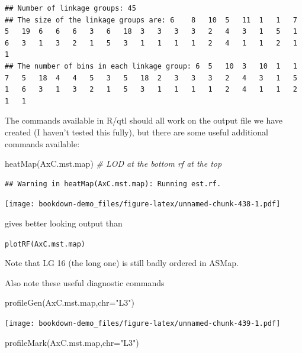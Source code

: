 \documentclass[
]{book}
\newenvironment{Shaded}{\begin{snugshade}}{\end{snugshade}}
\newcommand{\AttributeTok}[1]{\textcolor[rgb]{0.77,0.63,0.00}{#1}}
\newcommand{\CommentTok}[1]{\textcolor[rgb]{0.56,0.35,0.01}{\textit{#1}}}
\newcommand{\FunctionTok}[1]{\textcolor[rgb]{0.00,0.00,0.00}{#1}}
\newcommand{\NormalTok}[1]{#1}
\newcommand{\StringTok}[1]{\textcolor[rgb]{0.31,0.60,0.02}{#1}}
\begin{document}
\begin{verbatim}
## Number of linkage groups: 45
## The size of the linkage groups are: 6    8   10  5   11  1   1   7   5   19  6   6   6   3   6   18  3   3   3   3   2   4   3   1   5   1   6   3   1   3   2   1   5   3   1   1   1   1   2   4   1   1   2   1   1   
## The number of bins in each linkage group: 6  5   10  3   10  1   1   7   5   18  4   4   5   3   5   18  2   3   3   3   2   4   3   1   5   1   6   3   1   3   2   1   5   3   1   1   1   1   2   4   1   1   2   1   1   
\end{verbatim}

The commands available in R/qtl should all work on the output file we have created (I haven't tested this fully), but there are some useful additional commands available:

\begin{Shaded}
\begin{Highlighting}[]
\FunctionTok{heatMap}\NormalTok{(AxC.mst.map) }\CommentTok{\# LOD at the bottom rf at the top }
\end{Highlighting}
\end{Shaded}

\begin{verbatim}
## Warning in heatMap(AxC.mst.map): Running est.rf.
\end{verbatim}

\texttt{[image: bookdown-demo\_files/figure-latex/unnamed-chunk-438-1.pdf]}

gives better looking output than

\texttt{plotRF(AxC.mst.map)}

Note that LG 16 (the long one) is still badly ordered in ASMap.

Also note these useful diagnostic commands

\begin{Shaded}
\begin{Highlighting}[]
\FunctionTok{profileGen}\NormalTok{(AxC.mst.map,}\AttributeTok{chr=}\StringTok{"L3"}\NormalTok{) }
\end{Highlighting}
\end{Shaded}

\texttt{[image: bookdown-demo\_files/figure-latex/unnamed-chunk-439-1.pdf]}

\begin{Shaded}
\begin{Highlighting}[]
\FunctionTok{profileMark}\NormalTok{(AxC.mst.map,}\AttributeTok{chr=}\StringTok{"L3"}\NormalTok{) }
\end{Highlighting}
\end{Shaded}
\end{document}
